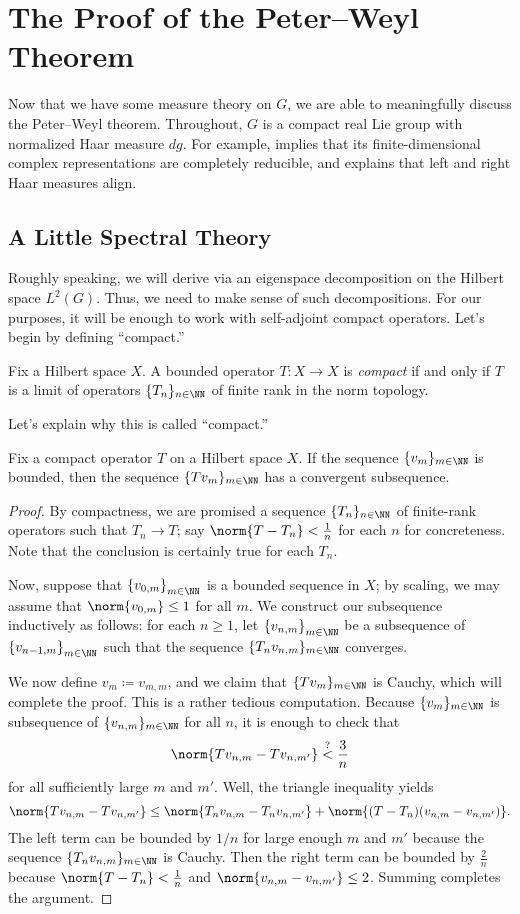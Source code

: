 \documentclass[notes.tex]{subfiles}
\begin{document}
\section{The Proof of the Peter--Weyl Theorem} \label{sec:pw}
Now that we have some measure theory on $G$, we are able to meaningfully discuss the Peter--Weyl theorem. Throughout, $G$ is a compact real Lie group with normalized Haar measure $dg$. For example,  implies that its finite-dimensional complex representations are completely reducible, and  explains that left and right Haar measures align.

\subsection{A Little Spectral Theory}
Roughly speaking, we will derive  via an eigenspace decomposition on the Hilbert space $L^2(G)$. Thus, we need to make sense of such decompositions. For our purposes, it will be enough to work with self-adjoint compact operators. Let's begin by defining ``compact.''
\begin{definition}[compact]
	Fix a Hilbert space $X$. A bounded operator $T\colon X\to X$ is \textit{compact} if and only if $T$ is a limit of operators $\{T_n\}_{n\in\NN}$ of finite rank in the norm topology.
\end{definition}
Let's explain why this is called ``compact.''
\begin{lemma} \label{lem:compact-gives-convergence}
	Fix a compact operator $T$ on a Hilbert space $X$. If the sequence $\{v_m\}_{m\in\NN}$ is bounded, then the sequence $\{Tv_m\}_{m\in\NN}$ has a convergent subsequence.
\end{lemma}
\begin{proof}
	By compactness, we are promised a sequence $\{T_n\}_{n\in\NN}$ of finite-rank operators such that $T_n\to T$; say $\norm{T-T_n}<\frac1n$ for each $n$ for concreteness. Note that the conclusion is certainly true for each $T_n$.

	Now, suppose that $\left\{v_{0,m}\right\}_{m\in\NN}$ is a bounded sequence in $X$; by scaling, we may assume that $\norm{v_{0,m}}\le1$ for all $m$. We construct our subsequence inductively as follows: for each $n\ge1$, let $\left\{v_{n,m}\right\}_{m\in\NN}$ be a subsequence of $\left\{v_{n-1,m}\right\}_{m\in\NN}$ such that the sequence $\{T_nv_{n,m}\}_{m\in\NN}$ converges.
	
	We now define $v_m\coloneqq v_{m,m}$, and we claim that $\{Tv_m\}_{m\in\NN}$ is Cauchy, which will complete the proof. This is a rather tedious computation. Because $\{v_m\}_{m\in\NN}$ is subsequence of $\{v_{n,m}\}_{m\in\NN}$ for all $n$, it is enough to check that
	\[\norm{Tv_{n,m}-Tv_{n,m'}}\stackrel?<\frac3n\]
	for all sufficiently large $m$ and $m'$. Well, the triangle inequality yields
	\[\norm{Tv_{n,m}-Tv_{n,m'}}\le\norm{T_nv_{n,m}-T_nv_{n,m'}}+\norm{(T-T_n)(v_{n,m}-v_{n,m'})}.\]
	The left term can be bounded by $1/n$ for large enough $m$ and $m'$ because the sequence $\{T_nv_{n,m}\}_{m\in\NN}$ is Cauchy. Then the right term can be bounded by $\frac2n$ because $\norm{T-T_n}<\frac1n$ and $\norm{v_{n,m}-v_{n,m'}}\le2$. Summing completes the argument.
\end{proof}
\end{document}
